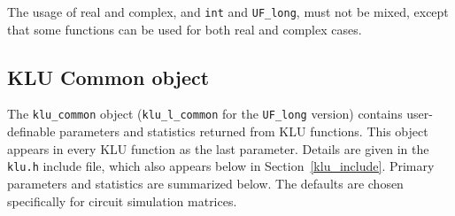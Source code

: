 \documentclass[11pt]{article}
\begin{document}
The usage of real and complex, and {\tt int} and {\tt UF\_long}, must not be
mixed, except that some functions can be used for both real and complex cases.

\subsection{KLU Common object}

The {\tt klu\_common} object ({\tt klu\_l\_common} for the {\tt UF\_long}
version) contains user-definable parameters and statistics returned from
KLU functions.  This object appears in every KLU function as the last
parameter.  Details are given in the {\tt klu.h} include file, which also
appears below in Section~\ref{klu_include}.  Primary parameters and statistics
are summarized below.  The defaults are chosen specifically for circuit
simulation matrices.
\end{document}
